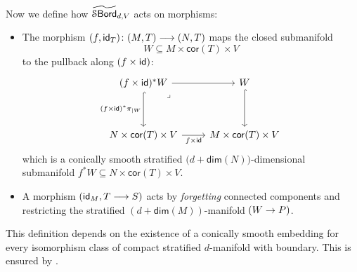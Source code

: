 \begin{definition}
    \noindent Now we define how $\operatorname{\widetilde{\mathcal S\mathsf{Bord}}}_{d,V}$ acts on morphisms:
    \begin{itemize}
    \item[$(\man)$] The morphism $(f,\mathsf{id}_{T})\colon (M,T) \longrightarrow (N,T)$ maps the closed submanifold 
    \begin{equation}
    W\subseteq M\times \mathsf{cor}(T) \times V
    \end{equation}
    to the pullback along $(f\times \operatorname{\sf id})$:
    \begin{equation}
        \begin{tikzcd}[ampersand replacement=\&]
            {(f\times \id)^\ast W} \& {W} \\
            \\
            N\times \mathsf{cor}(T) \times V \& M\times \mathsf{cor}(T) \times V
            \arrow[from=1-1, to=1-2]
            \arrow[hook, "(f\times \id)^\ast \pi_{|W}"',from=1-1, to=3-1]
            \arrow["\lrcorner"{anchor=center, pos=0.125}, draw=none, from=1-1, to=3-2]
            \arrow[hook, from=1-2, to=3-2]
            \arrow["f\times \id"', from=3-1, to=3-2]
        \end{tikzcd}
    \end{equation}
    which is a conically smooth stratified $\big(d + \mathsf{dim}(N)\big)$-dimensional submanifold $f^\ast W \subseteq N \times \mathsf{cor}(T) \times V$.
    \item[$(\Int)$] A morphism $(\operatorname{\sf id}_M, T \longrightarrow S)$ acts by \emph{forgetting} connected components and restricting the stratified $(d+\mathsf{dim}(M))$-manifold $(W\rightarrow P)$.
    \end{itemize}  
\end{definition}

\begin{remark}
    This definition depends on the existence of a conically smooth embedding for every isomorphism class of compact stratified $d$-manifold with boundary. This is ensured by .  
\end{remark}

